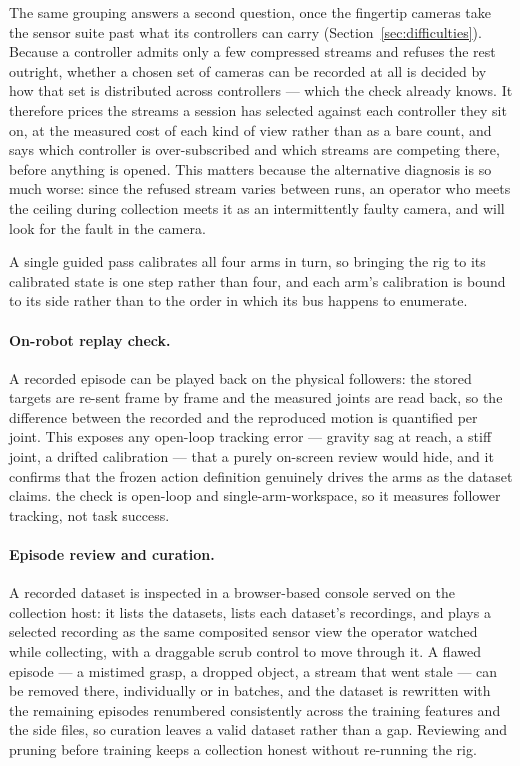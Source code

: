 The same grouping answers a second question, once the fingertip cameras take
the sensor suite past what its controllers can carry
(Section~\ref{sec:difficulties}). Because a controller admits only a few
compressed streams and refuses the rest outright, whether a chosen set of
cameras can be recorded at all is decided by how that set is distributed across
controllers --- which the check already knows. It therefore prices the streams a
session has selected against each controller they sit on, at the measured cost
of each kind of view rather than as a bare count, and says which controller is
over-subscribed and which streams are competing there, before anything is
opened. This matters because the alternative diagnosis is so much worse: since
the refused stream varies between runs, an operator who meets the ceiling during
collection meets it as an intermittently faulty camera, and will look for the
fault in the camera.

A single guided pass calibrates all four
arms in turn, so bringing the rig to its calibrated state is one step
rather than four, and each arm's calibration is bound to its side rather
than to the order in which its bus happens to enumerate.

\paragraph{On-robot replay check.} A recorded episode can be played back on
the physical followers: the stored targets are re-sent frame by frame and
the measured joints are read back, so the difference between the recorded
and the reproduced motion is quantified per joint. This exposes any
open-loop tracking error --- gravity sag at reach, a stiff joint, a drifted
calibration --- that a purely on-screen review would hide, and it confirms
that the frozen action definition genuinely drives the arms as the dataset
claims. \unjustified{} the check is open-loop and single-arm-workspace, so
it measures follower tracking, not task success.

\paragraph{Episode review and curation.} A recorded dataset is inspected in
a browser-based console served on the collection host: it lists the
datasets, lists each dataset's recordings, and plays a selected recording as
the same composited sensor view the operator watched while collecting, with a
draggable scrub control to move through it. A flawed episode --- a mistimed
grasp, a dropped object, a stream that went stale --- can be removed there,
individually or in batches, and the dataset is rewritten with the remaining
episodes renumbered consistently across the training features and the side
files, so curation leaves a valid dataset rather than a gap. Reviewing and
pruning before training keeps a collection honest without re-running the rig.

